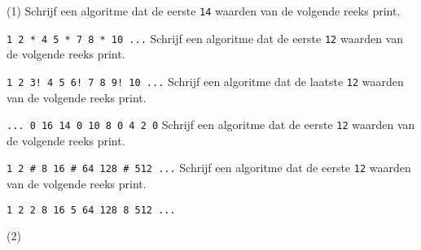 \begin{exercise}
    \begin{longtasks}(1)
        \task
        Schrijf een algoritme dat de eerste \texttt{14} waarden van de volgende reeks print.

        \texttt{1 2 * 4 5 * 7 8 * 10 ...}
        \task
        Schrijf een algoritme dat de eerste \texttt{12} waarden van de volgende reeks print.

        \texttt{1 2 3! 4 5 6! 7 8 9! 10 ...}
        \task
        Schrijf een algoritme dat de laatste \texttt{12} waarden van de volgende reeks print.

        \texttt{... 0 16 14 0 10 8 0 4 2 0}
        \task
        Schrijf een algoritme dat de eerste \texttt{12} waarden van de volgende reeks print.

        \texttt{1 2 \# 8 16 \# 64 128 \# 512 ...}
        \task
        Schrijf een algoritme dat de eerste \texttt{12} waarden van de volgende reeks print.

        \texttt{1 2 2 8 16 5 64 128 8 512 ...}
    \end{longtasks}
\end{exercise}

\begin{solution}
    \begin{mltasks}(2)
        \task {}
        \task {}
        \task {}
        \task {}
        \task {}
    \end{mltasks}
\end{solution}
